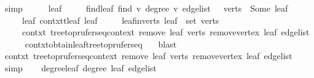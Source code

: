 \begin{isabellebody}
\ simp\isanewline
\ \ \isamarkupfalse%
\ \isamarkupfalse%
\ leaf\isanewline
\ \ \ \ \ find{\isacharunderscore}{\kern0pt}leaf{\isacharcolon}{\kern0pt}\ {\isachardoublequoteopen}find\ {\isacharparenleft}{\kern0pt}{\isasymlambda}v{\isachardot}{\kern0pt}\ degree\ v\ {\isacharquery}{\kern0pt}edge{\isacharunderscore}{\kern0pt}list\ {\isacharequal}{\kern0pt}\ {}{\isacharparenright}{\kern0pt}\ verts\ {\isacharequal}{\kern0pt}\ Some\ leaf{\isachardoublequoteclose}\isanewline
\ \ \ \ \ leaf{\isacharcolon}{\kern0pt}\ {\isachardoublequoteopen}contxt{\isachardot}{\kern0pt}t{\isachardot}{\kern0pt}leaf\ leaf{\isachardoublequoteclose}\isanewline
\ \ \ \ \ leaf{\isacharunderscore}{\kern0pt}in{\isacharunderscore}{\kern0pt}verts{\isacharcolon}{\kern0pt}\ {\isachardoublequoteopen}leaf\ {\isasymin}\ set\ verts{\isachardoublequoteclose}\isanewline
\ \ \ \ \ contxt{\isacharprime}{\kern0pt}{\isacharcolon}{\kern0pt}\ {\isachardoublequoteopen}tree{\isacharunderscore}{\kern0pt}to{\isacharunderscore}{\kern0pt}prufer{\isacharunderscore}{\kern0pt}seq{\isacharunderscore}{\kern0pt}context\ {\isacharparenleft}{\kern0pt}remove{}\ leaf\ verts{\isacharparenright}{\kern0pt}\ {\isacharparenleft}{\kern0pt}remove{\isacharunderscore}{\kern0pt}vertex\ leaf\ {\isacharquery}{\kern0pt}edge{\isacharunderscore}{\kern0pt}list{\isacharparenright}{\kern0pt}{\isachardoublequoteclose}\isanewline
\ \ \ \ \isamarkupfalse%
\ contxt{\isachardot}{\kern0pt}obtain{\isacharunderscore}{\kern0pt}leaf{\isacharunderscore}{\kern0pt}tree{\isacharunderscore}{\kern0pt}to{\isacharunderscore}{\kern0pt}prufer{\isacharunderscore}{\kern0pt}seq\ {}\ \isamarkupfalse%
\ blast\isanewline
\ \ \isamarkupfalse%
\ \isamarkupfalse%
\ contxt{\isacharprime}{\kern0pt}{\isacharcolon}{\kern0pt}\ tree{\isacharunderscore}{\kern0pt}to{\isacharunderscore}{\kern0pt}prufer{\isacharunderscore}{\kern0pt}seq{\isacharunderscore}{\kern0pt}context\ {\isachardoublequoteopen}remove{}\ leaf\ verts{\isachardoublequoteclose}\ {\isachardoublequoteopen}remove{\isacharunderscore}{\kern0pt}vertex\ leaf\ {\isacharquery}{\kern0pt}edge{\isacharunderscore}{\kern0pt}list{\isachardoublequoteclose}\ \isamarkupfalse%
\ simp\isanewline
\isanewline
\ \ \isamarkupfalse%
\ degree{\isacharunderscore}{\kern0pt}leaf{\isacharcolon}{\kern0pt}\ {\isachardoublequoteopen}degree\ leaf\ {\isacharquery}{\kern0pt}edge{\isacharunderscore}{\kern0pt}list\ {\isacharequal}{\kern0pt}\ {}{\isachardoublequoteclose}\ \isamarkupfalse%

\end{isabellebody}
